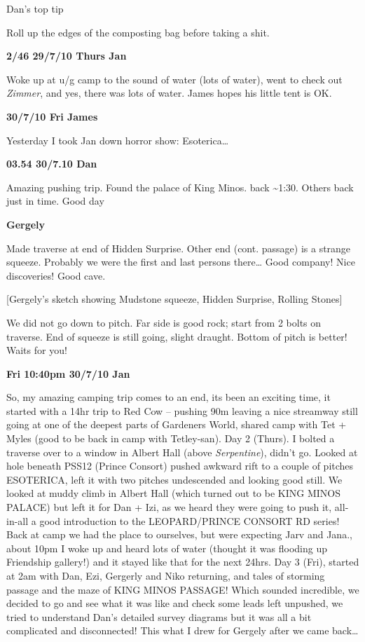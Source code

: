 Dan's top tip

Roll up the edges of the composting bag before taking a shit.

\textbf{2/46 29/7/10 Thurs Jan}

Woke up at u/g camp to the sound of water (lots of water), went to check
out \emph{Zimmer}, and yes, there was lots of water. James hopes his
little tent is OK.

\textbf{30/7/10 Fri James}

Yesterday I took Jan down horror show: Esoterica\ldots{}

\textbf{03.54 30/7.10 Dan}

Amazing pushing trip. Found the palace of King Minos. back
\textasciitilde{}1:30. Others back just in time. Good day

\textbf{Gergely}

Made traverse at end of Hidden Surprise. Other end (cont. passage) is a
strange squeeze. Probably we were the first and last persons
there\ldots{} Good company! Nice discoveries! Good cave.

{[}Gergely's sketch showing Mudstone squeeze, Hidden Surprise, Rolling
Stones{]}

We did not go down to pitch. Far side is good rock; start from 2 bolts
on traverse. End of squeeze is still going, slight draught. Bottom of
pitch is better! Waits for you!

\textbf{Fri 10:40pm 30/7/10 Jan}

So, my amazing camping trip comes to an end, its been an exciting time,
it started with a 14hr trip to Red Cow -- pushing 90m leaving a nice
streamway still going at one of the deepest parts of Gardeners World,
shared camp with Tet + Myles (good to be back in camp with Tetley-san).
Day 2 (Thurs). I bolted a traverse over to a window in Albert Hall
(above \emph{Serpentine}), didn't go. Looked at hole beneath PSS12
(Prince Consort) pushed awkward rift to a couple of pitches ESOTERICA,
left it with two pitches undescended and looking good still. We looked
at muddy climb in Albert Hall (which turned out to be KING MINOS PALACE)
but left it for Dan + Izi, as we heard they were going to push it,
all-in-all a good introduction to the LEOPARD/PRINCE CONSORT RD series!
Back at camp we had the place to ourselves, but were expecting Jarv and
Jana., about 10pm I woke up and heard lots of water (thought it was
flooding up Friendship gallery!) and it stayed like that for the next
24hrs. Day 3 (Fri), started at 2am with Dan, Ezi, Gergerly and Niko
returning, and tales of storming passage and the maze of KING MINOS
PASSAGE! Which sounded incredible, we decided to go and see what it was
like and check some leads left unpushed, we tried to understand Dan's
detailed survey diagrams but it was all a bit complicated and
disconnected! This what I drew for Gergely after we came back\ldots{}

